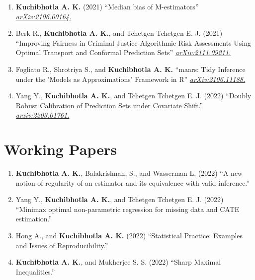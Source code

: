 \documentclass[10pt]{article}
\numberwithin{myalgctr}{section}
\begin{document}
\begin{enumerate}
  \item \textbf{Kuchibhotla A. K.} (2021) ``Median bias of M-estimators'' \href{https://arxiv.org/abs/2106.00164}{\emph{arXiv:2106.00164.}}
\item Berk R., \textbf{Kuchibhotla A. K.}, and Tchetgen Tchetgen E. J. (2021) ``Improving Fairness in Criminal Justice Algorithmic Risk Assessments Using Optimal Transport and Conformal Prediction Sets'' \href{https://arxiv.org/pdf/2111.09211.pdf}{\emph{arXiv:2111.09211.}}
  \item Fogliato R., Shrotriya S., and \textbf{Kuchibhotla A. K.} ``maars: Tidy Inference under the 'Models as Approximations' Framework in R'' \href{https://arxiv.org/abs/2106.11188}{\emph{arXiv:2106.11188.}}
  \item Yang Y., \textbf{Kuchibhotla A. K.}, and Tchetgen Tchetgen E. J. (2022) ``Doubly Robust Calibration of Prediction Sets under Covariate Shift.'' \href{https://arxiv.org/abs/2203.01761}{\emph{arxiv:2203.01761.}}
\end{enumerate}
\section*{Working Papers}
\begin{enumerate}
    \item \textbf{Kuchibhotla A. K.}, Balakrishnan, S., and Wasserman L. (2022) ``A new notion of regularity of an estimator and its equivalence with valid inference.''
    \item Yang Y., \textbf{Kuchibhotla A. K.}, and Tchetgen Tchetgen E. J. (2022) ``Minimax optimal non-parametric regression for missing data and CATE estimation.''
    \item Hong A., and \textbf{Kuchibhotla A. K.} (2022) ``Statistical Practice: Examples and Issues of Reproducibility.''
    \item \textbf{Kuchibhotla A. K.}, and Mukherjee S. S. (2022) ``Sharp Maximal Inequalities.''
\end{enumerate}
\end{document}
